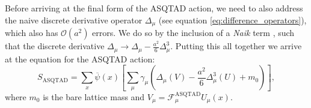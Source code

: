 Before arriving at the final form of  the ASQTAD action, we need to also address the naive discrete derivative operator $\Delta_\mu$ (see equation \ref{eq:difference_operators}), which also has $\mathcal{O}(a^2)$ errors.  We do so by the inclusion of a \textit{Naik} term \cite{NAIK1989238}, such that the discrete derivative $\Delta_\mu \rightarrow \Delta_\mu - \frac{a^2}{6}\Delta^3_\mu$.  Putting this all together we arrive at the equation for the ASQTAD action:
\begin{equation}\label{eq:ASQTAD_action}
    S_\mathrm{ASQTAD} = \sum_x \overline{\psi}(x)\left[ 
    \sum_\mu \gamma_\mu \left( \Delta_\mu (V) - \frac{a^2}{6}\Delta^3_\mu(U) + m_0\right) \right],
\end{equation}
where $m_0$ is the bare lattice mass and $V_\mu = \mathcal{F}_\mu^\mathrm{ASQTAD} U_\mu(x)$.

